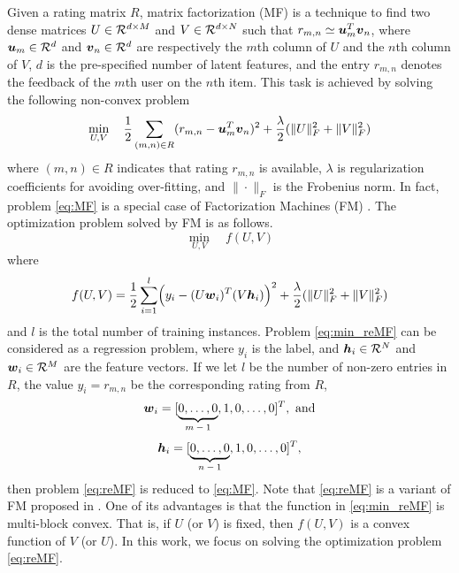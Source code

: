 \label{sec:intro}
\par Given a rating matrix $R$,  matrix factorization (MF) is a technique to find two dense matrices $U \in \mathcal R^{d \times M}$ and $V \in \mathcal R^{d \times N}$ such that $r_{m,n} \simeq \boldsymbol{u}_m^T\boldsymbol{v}_n$, where $\boldsymbol{u}_m \in \mathcal R^d$ and $\boldsymbol{v}_n \in \mathcal R^d$ are respectively the $m$th column of $U$ and the $n$th column of $V$, $d$ is the pre-specified number of latent features, and the entry $r_{m,n}$ denotes the feedback of the $m$th user on the $n$th item.  This task is achieved by solving the following non-convex problem
\begin{equation}
    \min_{U,V} \quad \frac{1}{2}\sum_{(m, n) \in R}  (r_{m,n} - \boldsymbol{u}_m^T \boldsymbol{v}_n)^2+
    \frac{\lambda}{2} (\|U\|^2_F + \|V\|^2_F	)
    \label{eq:MF}
\end{equation}
where $(m, n) \in R$ indicates that rating $r_{m,n}$ is available, $\lambda$ is regularization coefficients for avoiding over-fitting, and $\|\cdot\|_F$ is the Frobenius norm.
In fact, problem \eqref{eq:MF} is a special case of Factorization Machines (FM) \citep{SR10c}. The optimization problem solved by FM is as follows.
\begin{equation}
\min_{U, V} \quad f(U, V)\label{eq:reMF}
\end{equation}
where 
\begin{equation}
    f(U, V) = \frac{1}{2}\sum_{i=1}^l  \Bigl(y_i - (U \boldsymbol{w}_i)^T (V \boldsymbol{h}_i)\Bigr)^2+
    \frac{\lambda}{2} (\|U\|^2_F +\|V\|^2_F	)
    \label{eq:min_reMF}
\end{equation}
and $l$ is the total number of training instances. Problem \eqref{eq:min_reMF} can be considered as a regression problem, where $y_i$ is the label, and $\boldsymbol{h}_i \in \mathcal R^N $ and $\boldsymbol{w}_i \in \mathcal R^M$ are the feature vectors. If we let $l$ be the number of non-zero entries in $R$, the value $y_i=r_{m, n}$ be the corresponding rating from $R$,
\begin{equation}
    \boldsymbol{w}_i=[\underbrace{0,\dots,0}_{\text{$m-1$}},1,0,\dots,0]^T
    \label{eq:wi},\text{ and}
\end{equation}
\begin{equation}
    \boldsymbol{h}_i=[\underbrace{0,\dots,0}_{\text{$n-1$}},1,0,\dots,0]^T
    \label{eq:hi},
\end{equation}
then problem \eqref{eq:reMF} is reduced to \eqref{eq:MF}. Note that \eqref{eq:reMF} is a variant of FM proposed in \citet{MB16a}. 
One of its advantages is that the function in \eqref{eq:min_reMF} is multi-block convex. That is, if $U$ (or $V$) is fixed, then $f(U,V)$ is a convex function of $V$ (or $U$). In this work, we focus on solving the optimization  problem \eqref{eq:reMF}.

